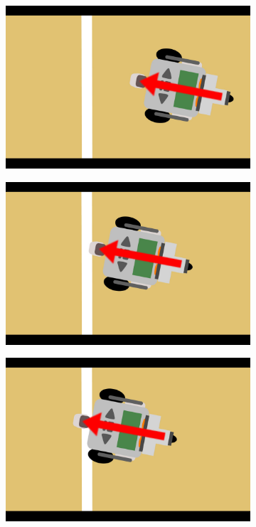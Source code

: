 \documentclass[tt3]{penoverslag}
\begin{document}
\begin{figure}
\centering
	\begin{subfigure}[h]{0.24\textwidth}
		\includegraphics[width=\textwidth]{WitteLijn1}
		\caption{}
		\label{fig:AlgoWit1}
	\end{subfigure}
	\begin{subfigure}[h]{0.24\textwidth}
		\includegraphics[width=\textwidth]{WitteLijn2}
		\caption{}
		\label{fig:AlgoWit2}
	\end{subfigure}
	\begin{subfigure}[h]{0.24\textwidth}
		\includegraphics[width=\textwidth]{WitteLijn3}

\end{subfigure}
\end{figure}
\end{document}
